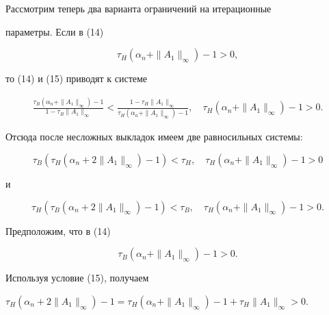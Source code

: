  


Рассмотрим теперь два варианта ограничений на итерационные  


параметры. Если в (14) 


\begin{equation} 


\tau_H(\alpha_n+\|A_1\|_\infty)-1>0, 


\end{equation} 


то (14) и (15) приводят к системе 


\begin{gather*} 


\frac{\tau_B(\alpha_n+\|A_1\|_\infty)-1} 


{1-\tau_B\|A_1\|_\infty}<\frac{1-\tau_H\|A_1\|_\infty} 


{\tau_H(\alpha_n+\|A_1\|_\infty)-1},\quad


\tau_H(\alpha_n+\|A_1\|_\infty)-1>0. 


\end{gather*} 


Отсюда после несложных выкладок имеем две равносильных системы:


\begin{equation} 


\tau_B(\tau_H(\alpha_n+2\|A_1\|_\infty)-1)<\tau_H,\quad 


\tau_H(\alpha_n+\|A_1\|_\infty)-1>0 


\end{equation} 


и 


\begin{equation} 


\tau_H(\tau_B(\alpha_n+2\|A_1\|_\infty)-1)<\tau_B,\quad 


\tau_H(\alpha_n+\|A_1\|_\infty)-1>0. 


\end{equation} 


Предположим, что в (14) 


\begin{equation} 


\tau_B(\alpha_n+\|A_1\|_\infty)-1>0. 


\end{equation} 


Используя условие (15), получаем 


$\tau_H(\alpha_n+2\|A_1\|_\infty)-1=\tau_H(\alpha_n+ 


\|A_1\|_\infty)-1+\tau_H\|A_1\|_\infty>0$. 


